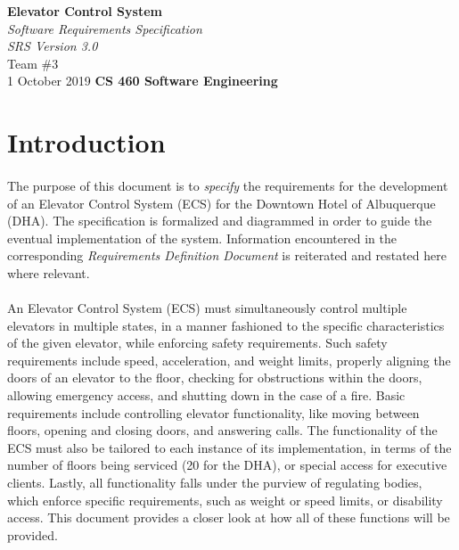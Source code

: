 \documentclass[12pt]{article}
\begin{document}
\begin{titlepage}
	\begin{flushleft}
		\vspace{1cm} \Huge  \textbf{Elevator Control System}\\
		\vspace{1cm} \Huge  \textit{Software Requirements Specification}\\
		\vspace{1cm} \Large \textit{SRS Version 3.0}\\
		\vspace{5cm} \LARGE         Team \#3\\ 
		                            1 October 2019
		\vfill       \Huge  \textbf{CS 460 Software Engineering}
	\end{flushleft}
\end{titlepage}
\normalsize \tableofcontents
\pagebreak

\section{Introduction} \label{intro} %
	\paragraph{} The purpose of this document is to \textit{specify} the requirements for the
	 development of an Elevator Control System (ECS) for the Downtown Hotel of Albuquerque 
	 (DHA). The specification is formalized and diagrammed in order to guide the eventual
	 implementation of the system. Information encountered in the corresponding \textit{Requirements 
	 Definition Document} is reiterated and restated here where relevant.
	 
	 \paragraph{} An Elevator Control System (ECS) must simultaneously control multiple 
	 elevators in multiple states, in a manner fashioned to the specific characteristics 
	 of the given elevator, while enforcing safety requirements. Such safety requirements 
	 include speed, acceleration, and weight limits, properly aligning the doors of 
	 an elevator to the floor, checking for obstructions within the doors, allowing 
	 emergency access, and shutting down in the case of a fire. Basic requirements 
	 include controlling elevator functionality, like moving between floors, opening 
	 and closing doors, and answering calls. The functionality of the ECS must also 
	 be tailored to each instance of its implementation, in terms of the number of 
	 floors being serviced (20 for the DHA), or special access for executive clients. 
	 Lastly, all functionality falls under the purview of regulating bodies, which 
	 enforce specific requirements, such as weight or speed limits, or disability 
	 access. This document provides a closer look at how all of these functions will be
	 provided.
	 
\end{document}
